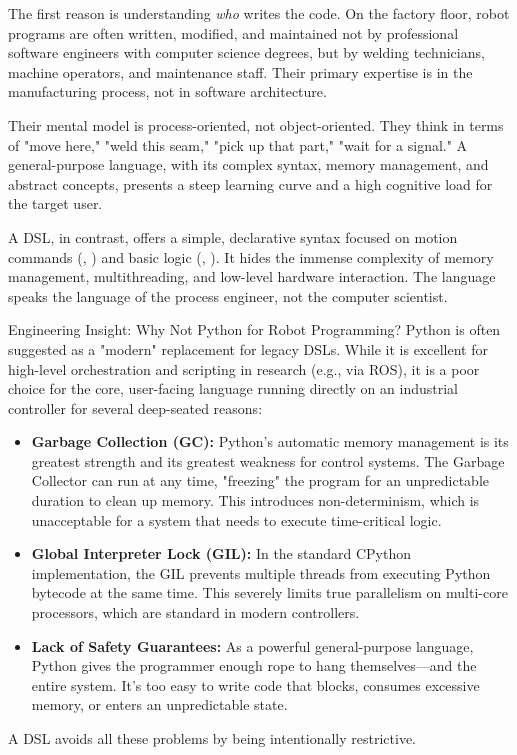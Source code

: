 The first reason is understanding \textit{who} writes the code. On the factory floor, robot programs are often written, modified, and maintained not by professional software engineers with computer science degrees, but by welding technicians, machine operators, and maintenance staff. Their primary expertise is in the manufacturing process, not in software architecture.

Their mental model is process-oriented, not object-oriented. They think in terms of "move here," "weld this seam," "pick up that part," "wait for a signal." A general-purpose language, with its complex syntax, memory management, and abstract concepts, presents a steep learning curve and a high cognitive load for the target user.

A DSL, in contrast, offers a simple, declarative syntax focused on motion commands (, ) and basic logic (, ). It hides the immense complexity of memory management, multithreading, and low-level hardware interaction. The language speaks the language of the process engineer, not the computer scientist.

\begin{tipbox}{Engineering Insight: Why Not Python for Robot Programming?}
    Python is often suggested as a "modern" replacement for legacy DSLs. While it is excellent for high-level orchestration and scripting in research (e.g., via ROS), it is a poor choice for the core, user-facing language running directly on an industrial controller for several deep-seated reasons:
    \begin{itemize}
        \item \textbf{Garbage Collection (GC):} Python's automatic memory management is its greatest strength and its greatest weakness for control systems. The Garbage Collector can run at any time, "freezing" the program for an unpredictable duration to clean up memory. This introduces non-determinism, which is unacceptable for a system that needs to execute time-critical logic.
        \item \textbf{Global Interpreter Lock (GIL):} In the standard CPython implementation, the GIL prevents multiple threads from executing Python bytecode at the same time. This severely limits true parallelism on multi-core processors, which are standard in modern controllers.
        \item \textbf{Lack of Safety Guarantees:} As a powerful general-purpose language, Python gives the programmer enough rope to hang themselves—and the entire system. It's too easy to write code that blocks, consumes excessive memory, or enters an unpredictable state.
    \end{itemize}
    A DSL avoids all these problems by being intentionally restrictive.
\end{tipbox}


